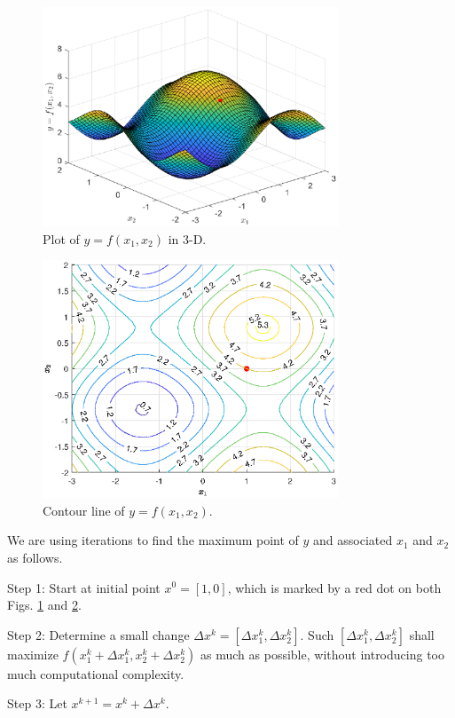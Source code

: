 \begin{figure}
	\centering
	\includegraphics[width=250pt]{chapters/chapter6/figures/gradientexp_3d.eps}
	\caption{Plot of $y=f(x_1, x_2)$ in 3-D.} \label{ch6fig:gradientexp_3d}
\end{figure}
\begin{figure}
	\centering
	\includegraphics[width=250pt]{chapters/chapter6/figures/gradientexp_contour.eps}
	\caption{Contour line of $y=f(x_1, x_2)$.} \label{ch6fig:gradientexp_contour}
\end{figure}

We are using iterations to find the maximum point of $y$ and associated $x_1$ and $x_2$ as follows.

Step 1: Start at initial point $x^0 = [1,0]$, which is marked by a red dot on both Figs. \ref{ch6fig:gradientexp_3d} and \ref{ch6fig:gradientexp_contour}.

Step 2: Determine a small change $\Delta x^k = [\Delta x_1^k, \Delta x_2^k]$. Such $[\Delta x_1^k, \Delta x_2^k]$ shall maximize $f(x_1^k+\Delta x_1^k, x_2^k+\Delta x_2^k)$ as much as possible, without introducing too much computational complexity.

Step 3: Let $x^{k+1} = x^k + \Delta x^k$.

